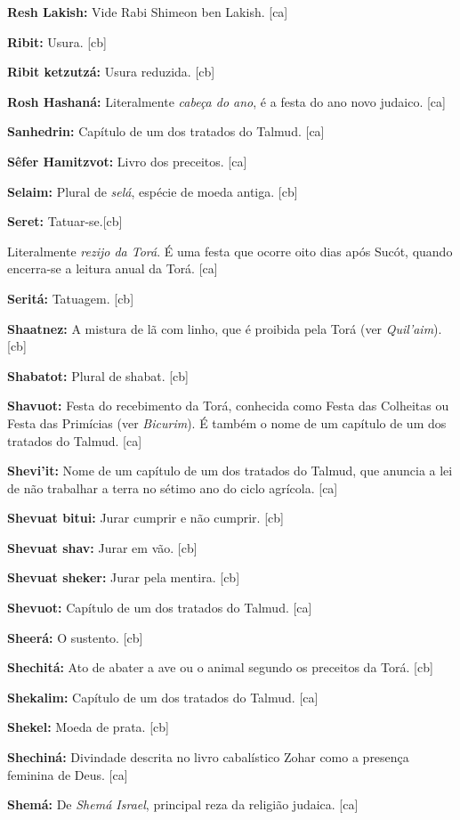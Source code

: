 \textbf{Resh Lakish:} Vide Rabi Shimeon ben Lakish. [ca]

\textbf{Ribit:} Usura. [cb]

\textbf{Ribit ketzutzá:} Usura reduzida. [cb]

\textbf{Rosh Hashaná:} Literalmente \emph{cabeça do ano}, é a 
festa do ano novo judaico. [ca]

\textbf{Sanhedrin:} Capítulo de um dos tratados do Talmud. [ca]

\textbf{Sêfer Hamitzvot:} Livro dos preceitos. [ca]

\textbf{Selaim:} Plural de \emph{selá}, espécie de moeda antiga. [cb]

\textbf{Seret:} Tatuar-se.[cb]

 Literalmente \emph{rezijo da Torá}. É uma festa que ocorre oito 
dias após Sucót, quando encerra-se a leitura anual da Torá. [ca]

\textbf{Seritá:} Tatuagem. [cb]

\textbf{Shaatnez:} A mistura de lã com linho, que é proibida 
pela Torá (ver \emph{Quil'aim}). [cb]

\textbf{Shabatot:} Plural de shabat. [cb]

\textbf{Shavuot:} Festa do recebimento da Torá, conhecida como Festa 
das Colheitas ou Festa das Primícias (ver \emph{Bicurim}). É também o 
nome de um capítulo de um dos tratados do Talmud. [ca]

\textbf{Shevi'it:} Nome de um capítulo de um dos tratados do Talmud, 
que anuncia a lei de não trabalhar a terra no sétimo ano do ciclo agrícola. [ca]

\textbf{Shevuat bitui:} Jurar cumprir e não cumprir. [cb]

\textbf{Shevuat shav:} Jurar em vão. [cb]

\textbf{Shevuat sheker:} Jurar pela mentira. [cb]

\textbf{Shevuot:} Capítulo de um dos tratados do Talmud. [ca]

\textbf{Sheerá:} O sustento. [cb]

\textbf{Shechitá:} Ato de abater a ave ou o animal segundo os preceitos
da Torá. [cb]

\textbf{Shekalim:} Capítulo de um dos tratados do Talmud. [ca]

\textbf{Shekel:} Moeda de prata. [cb]

\textbf{Shechiná:} Divindade descrita no livro cabalístico Zohar 
como a presença feminina de Deus. [ca]

\textbf{Shemá:} De \emph{Shemá Israel}, principal reza da religião judaica. [ca]

